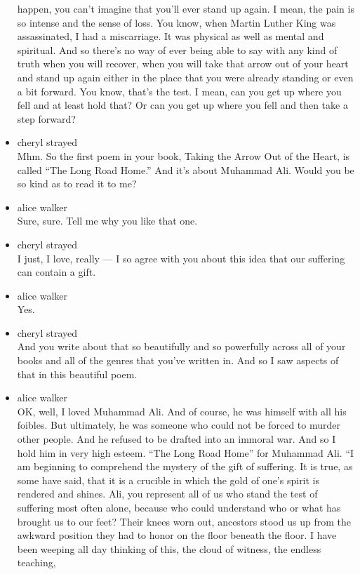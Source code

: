 \begin{itemize}
  happen, you can't imagine that you'll ever stand up again. I mean, the
  pain is so intense and the sense of loss. You know, when Martin Luther
  King was assassinated, I had a miscarriage. It was physical as well as
  mental and spiritual. And so there's no way of ever being able to say
  with any kind of truth when you will recover, when you will take that
  arrow out of your heart and stand up again either in the place that
  you were already standing or even a bit forward. You know, that's the
  test. I mean, can you get up where you fell and at least hold that? Or
  can you get up where you fell and then take a step forward?
\item
  cheryl strayed\\
  Mhm. So the first poem in your book, Taking the Arrow Out of the
  Heart, is called ``The Long Road Home.'' And it's about Muhammad Ali.
  Would you be so kind as to read it to me?
\item
  alice walker\\
  Sure, sure. Tell me why you like that one.
\item
  cheryl strayed\\
  I just, I love, really --- I so agree with you about this idea that
  our suffering can contain a gift.
\item
  alice walker\\
  Yes.
\item
  cheryl strayed\\
  And you write about that so beautifully and so powerfully across all
  of your books and all of the genres that you've written in. And so I
  saw aspects of that in this beautiful poem.
\item
  alice walker\\
  OK, well, I loved Muhammad Ali. And of course, he was himself with all
  his foibles. But ultimately, he was someone who could not be forced to
  murder other people. And he refused to be drafted into an immoral war.
  And so I hold him in very high esteem. ``The Long Road Home'' for
  Muhammad Ali. ``I am beginning to comprehend the mystery of the gift
  of suffering. It is true, as some have said, that it is a crucible in
  which the gold of one's spirit is rendered and shines. Ali, you
  represent all of us who stand the test of suffering most often alone,
  because who could understand who or what has brought us to our feet?
  Their knees worn out, ancestors stood us up from the awkward position
  they had to honor on the floor beneath the floor. I have been weeping
  all day thinking of this, the cloud of witness, the endless teaching,

\end{itemize}
